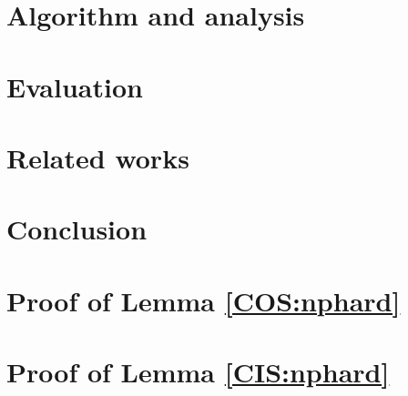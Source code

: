 \documentclass[conference]{IEEEtran}[10pt]
\begin{document}
\section{Algorithm and analysis}\label{sec:design}



\section{Evaluation}\label{sec:evaluation}



\section{Related works}\label{sec:relwork}



\section{Conclusion}\label{sec:conclusion}





%

\appendices
%
\section{Proof of Lemma \ref{COS:nphard}}\label{proof:COS}


%
\section{Proof of Lemma \ref{CIS:nphard}}\label{proof:CIS}

\end{document}
